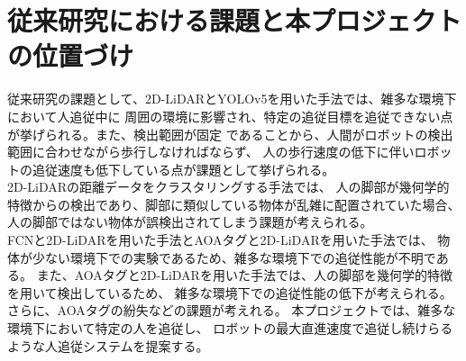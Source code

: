 \clearpage

\section{従来研究における課題と本プロジェクトの位置づけ}
従来研究の課題として、2D-LiDARとYOLOv5を用いた手法では、雑多な環境下において人追従中に
周囲の環境に影響され、特定の追従目標を追従できない点が挙げられる。また、検出範囲が固定
であることから、人間がロボットの検出範囲に合わせながら歩行しなければならず、
人の歩行速度の低下に伴いロボットの追従速度も低下している点が課題として挙げられる。\\ \indent
2D-LiDARの距離データをクラスタリングする手法では、
人の脚部が幾何学的特徴からの検出であり、脚部に類似している物体が乱雑に配置されていた場合、
人の脚部ではない物体が誤検出されてしまう課題が考えられる。\\ \indent
FCNと2D-LiDARを用いた手法とAOAタグと2D-LiDARを用いた手法では、
物体が少ない環境下での実験であるため、雑多な環境下での追従性能が不明である。
また、AOAタグと2D-LiDARを用いた手法では、人の脚部を幾何学的特徴を用いて検出しているため、
雑多な環境下での追従性能の低下が考えられる。さらに、AOAタグの紛失などの課題が考えれる。
本プロジェクトでは、雑多な環境下において特定の人を追従し、
ロボットの最大直進速度で追従し続けらるような人追従システムを提案する。